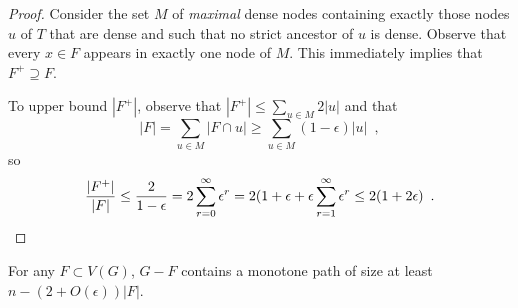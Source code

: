 \documentclass{patmorin}
\begin{document}
\begin{proof}
  Consider the set $M$ of \emph{maximal} dense nodes containing exactly
  those nodes $u$ of $T$ that are dense and such that no strict ancestor
  of $u$ is dense.  Observe that every $x\in F$ appears in exactly one
  node of $M$.  This immediately implies that $F^+\supseteq F$.

  To upper bound $|F^+|$, observe that $|F^+| \le \sum_{u\in M} 2|u|$
  and that 
  \[ 
     |F| = \sum_{u\in M} |F\cap u| \ge \sum_{u\in M} (1-\epsilon)|u| \enspace , 
  \]
  so
  \[
    \frac{|F^+|}{|F|} 
      \le \frac{2}{1-\epsilon} 
  = 2\sum_{r=0}^\infty\epsilon^r 
  = 2(1+\epsilon + \epsilon\sum_{r=1}^\infty \epsilon^r 
  \le 2(1+2\epsilon) \enspace . \qedhere
  \]
\end{proof}

\begin{clm}
  For any $F\subset V(G)$, $G-F$ contains a monotone path 
  of size at least $n - (2+O(\epsilon))|F|$.
\end{clm}
\end{document}
